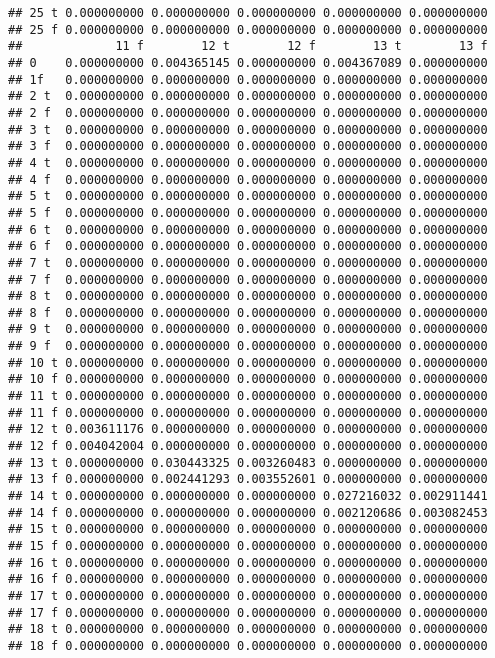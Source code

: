 \documentclass[]{article}
\begin{document}
\begin{verbatim}
## 25 t 0.000000000 0.000000000 0.000000000 0.000000000 0.000000000
## 25 f 0.000000000 0.000000000 0.000000000 0.000000000 0.000000000
##             11 f        12 t        12 f        13 t        13 f
## 0    0.000000000 0.004365145 0.000000000 0.004367089 0.000000000
## 1f   0.000000000 0.000000000 0.000000000 0.000000000 0.000000000
## 2 t  0.000000000 0.000000000 0.000000000 0.000000000 0.000000000
## 2 f  0.000000000 0.000000000 0.000000000 0.000000000 0.000000000
## 3 t  0.000000000 0.000000000 0.000000000 0.000000000 0.000000000
## 3 f  0.000000000 0.000000000 0.000000000 0.000000000 0.000000000
## 4 t  0.000000000 0.000000000 0.000000000 0.000000000 0.000000000
## 4 f  0.000000000 0.000000000 0.000000000 0.000000000 0.000000000
## 5 t  0.000000000 0.000000000 0.000000000 0.000000000 0.000000000
## 5 f  0.000000000 0.000000000 0.000000000 0.000000000 0.000000000
## 6 t  0.000000000 0.000000000 0.000000000 0.000000000 0.000000000
## 6 f  0.000000000 0.000000000 0.000000000 0.000000000 0.000000000
## 7 t  0.000000000 0.000000000 0.000000000 0.000000000 0.000000000
## 7 f  0.000000000 0.000000000 0.000000000 0.000000000 0.000000000
## 8 t  0.000000000 0.000000000 0.000000000 0.000000000 0.000000000
## 8 f  0.000000000 0.000000000 0.000000000 0.000000000 0.000000000
## 9 t  0.000000000 0.000000000 0.000000000 0.000000000 0.000000000
## 9 f  0.000000000 0.000000000 0.000000000 0.000000000 0.000000000
## 10 t 0.000000000 0.000000000 0.000000000 0.000000000 0.000000000
## 10 f 0.000000000 0.000000000 0.000000000 0.000000000 0.000000000
## 11 t 0.000000000 0.000000000 0.000000000 0.000000000 0.000000000
## 11 f 0.000000000 0.000000000 0.000000000 0.000000000 0.000000000
## 12 t 0.003611176 0.000000000 0.000000000 0.000000000 0.000000000
## 12 f 0.004042004 0.000000000 0.000000000 0.000000000 0.000000000
## 13 t 0.000000000 0.030443325 0.003260483 0.000000000 0.000000000
## 13 f 0.000000000 0.002441293 0.003552601 0.000000000 0.000000000
## 14 t 0.000000000 0.000000000 0.000000000 0.027216032 0.002911441
## 14 f 0.000000000 0.000000000 0.000000000 0.002120686 0.003082453
## 15 t 0.000000000 0.000000000 0.000000000 0.000000000 0.000000000
## 15 f 0.000000000 0.000000000 0.000000000 0.000000000 0.000000000
## 16 t 0.000000000 0.000000000 0.000000000 0.000000000 0.000000000
## 16 f 0.000000000 0.000000000 0.000000000 0.000000000 0.000000000
## 17 t 0.000000000 0.000000000 0.000000000 0.000000000 0.000000000
## 17 f 0.000000000 0.000000000 0.000000000 0.000000000 0.000000000
## 18 t 0.000000000 0.000000000 0.000000000 0.000000000 0.000000000
## 18 f 0.000000000 0.000000000 0.000000000 0.000000000 0.000000000

\end{verbatim}
\end{document}
